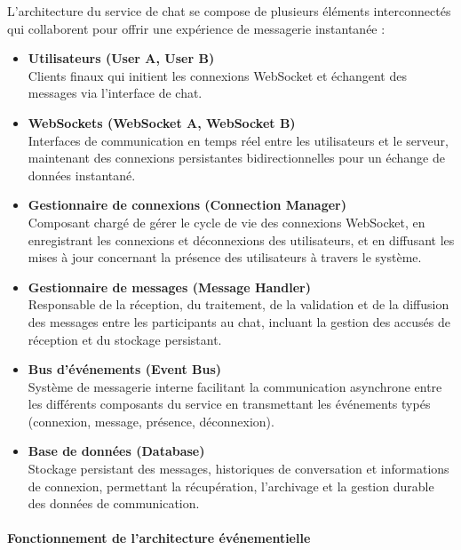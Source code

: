 \documentclass{rapportPfe}
\begin{document}
L'architecture du service de chat se compose de plusieurs éléments interconnectés qui collaborent pour offrir une expérience de messagerie instantanée :

\begin{itemize}
    \item \textbf{Utilisateurs (User A, User B)} \\
    Clients finaux qui initient les connexions WebSocket et échangent des messages via l'interface de chat.
    
    \item \textbf{WebSockets (WebSocket A, WebSocket B)} \\
    Interfaces de communication en temps réel entre les utilisateurs et le serveur, maintenant des connexions persistantes bidirectionnelles pour un échange de données instantané.
    
    \item \textbf{Gestionnaire de connexions (Connection Manager)} \\
    Composant chargé de gérer le cycle de vie des connexions WebSocket, en enregistrant les connexions et déconnexions des utilisateurs, et en diffusant les mises à jour concernant la présence des utilisateurs à travers le système.
    
    \item \textbf{Gestionnaire de messages (Message Handler)} \\
    Responsable de la réception, du traitement, de la validation et de la diffusion des messages entre les participants au chat, incluant la gestion des accusés de réception et du stockage persistant.
    
    \item \textbf{Bus d'événements (Event Bus)} \\
    Système de messagerie interne facilitant la communication asynchrone entre les différents composants du service en transmettant les événements typés (connexion, message, présence, déconnexion).
    
    \item \textbf{Base de données (Database)} \\
    Stockage persistant des messages, historiques de conversation et informations de connexion, permettant la récupération, l'archivage et la gestion durable des données de communication.
\end{itemize}

\paragraph{Fonctionnement de l'architecture événementielle}
\end{document}
